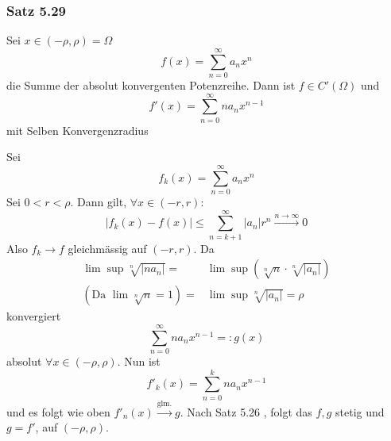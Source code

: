 \subsubsection*{Satz 5.29}
Sei $x\in\left( -\rho,\rho\right)=\Omega$ \[f\left( x \right) = \sum\limits_{n = 0}^\infty  {{a_n}{x^n}}\] die Summe der absolut konvergenten Potenzreihe. Dann ist $f\in C'\left( \Omega\right)$ und 
\[f'\left( x \right) = \sum\limits_{n = 0}^\infty  {n{a_n}{x^{n - 1}}} \]
mit Selben Konvergenzradius

\begin{beweis}{}
Sei 
\[{f_k}\left( x \right) = \sum\limits_{n = 0}^\infty  {{a_n}{x^n}} \]
Sei $0<r<\rho$. Dann gilt, $\forall x\in\left( -r,r\right)$: 
\[\left| {{f_k}\left( x \right) - f\left( x \right)} \right| \le \sum\limits_{n = k + 1}^\infty  {\left| {{a_n}} \right|{r^n}} \mathop  \to \limits^{n \to \infty } 0\]
Also $f_k\to f$ gleichmässig auf $\left( -r,r\right)$. Da
\begin{align*}
\lim \sup \sqrt[n]{{\left| {n{a_n}} \right|}} = &\lim \sup \left( {\sqrt[n]{n} \cdot \sqrt[n]{{\left| {{a_n}} \right|}}} \right)\\
\left( {{\text{Da }}\lim \sqrt[n]{n} = 1} \right) = &\lim \sup \sqrt[n]{{\left| {{a_n}} \right|}} = \rho 
\end{align*}
 konvergiert 
\[\sum\limits_{n = 0}^\infty  {n{a_n}{x^{n - 1}}}  = :g\left( x \right)\]
absolut $\forall x\in\left( -\rho,\rho\right)$. Nun ist 
\[f{'_k}\left( x \right) = \sum\limits_{n = 0}^k {n{a_n}{x^{n - 1}}} \]
und es folgt wie oben $f{'_n}\left( x \right)\mathop  \to \limits^{{\text{glm.}}} g$. Nach Satz 5.26 , folgt das $f,g$ stetig und $g=f'$, auf $\left( -\rho,\rho\right)$.
\end{beweis}

